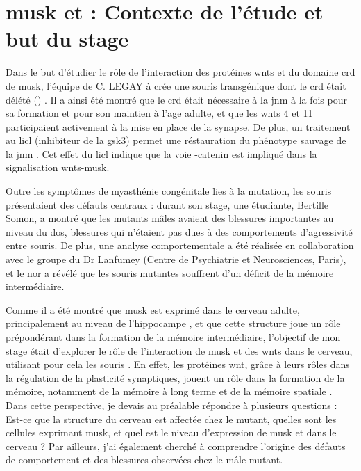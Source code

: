 \section{\acrshort{musk} et  : Contexte de l'étude et but du stage}
\label{sec:Contexte}	
	Dans le but d'étudier le rôle de l'interaction des protéines \Glspl{wnt} et du domaine \gls{crd} de \gls{musk}, l'équipe de C. LEGAY à crée une souris transgénique dont le \gls{crd} était délété (\mcrd) \cite{Messeant2015, Messeant2017}. Il a ainsi été montré que le \gls{crd} était nécessaire à la \gls{jnm} à la fois pour sa formation et pour son maintien à l'age adulte, et que les \Glspl{wnt} 4 et 11 participaient activement à la mise en place de la synapse. De plus, un traitement au \gls{licl} (inhibiteur de la \gls{gsk3}) permet une réstauration du phénotype sauvage de la \gls{jnm} \cite{Messeant2015}. Cet effet du \gls{licl} indique que la voie \textbeta{}-catenin est impliqué dans la signalisation \Glspl{wnt}-\gls{musk}. 
	
	Outre les symptômes de myasthénie congénitale lies à la mutation, les souris \mcrd présentaient des défauts centraux : durant son stage, une étudiante, Bertille Somon, a montré que les mutants mâles avaient des blessures importantes au niveau du dos, blessures qui n'étaient pas dues à des comportements d'agressivité entre souris. De plus, une analyse comportementale a été réalisée en collaboration avec le groupe du Dr Lanfumey (Centre de Psychiatrie et Neurosciences, Paris), et le \gls{nor} a révélé que les souris mutantes souffrent d'un déficit de la mémoire intermédiaire.
	
	Comme il a été montré que \gls{musk} est exprimé dans le cerveau adulte, principalement au niveau de l'hippocampe \cite{Garcia-Osta2006}, et que cette structure joue un rôle prépondérant dans la formation de la mémoire intermédiaire, l'objectif de mon stage était d'explorer le rôle de l'interaction de \gls{musk} et des \Glspl{wnt} dans le cerveau, utilisant pour cela les souris \mcrd. En effet, les protéines \gls{wnt}, grâce à leurs rôles dans la régulation de la plasticité synaptiques, jouent un rôle dans la formation de la mémoire, notamment de la mémoire à long terme et de la mémoire spatiale \cite{Tan2013, Oliva2013a}. Dans cette perspective, je devais au préalable répondre à plusieurs questions : Est-ce que la structure du cerveau est affectée chez le mutant, quelles sont les cellules exprimant \gls{musk}, et quel est le niveau d'expression de \gls{musk} et \mcrd dans le cerveau ? Par ailleurs, j'ai également cherché à comprendre l'origine des défauts de comportement et des blessures observées chez le mâle mutant.